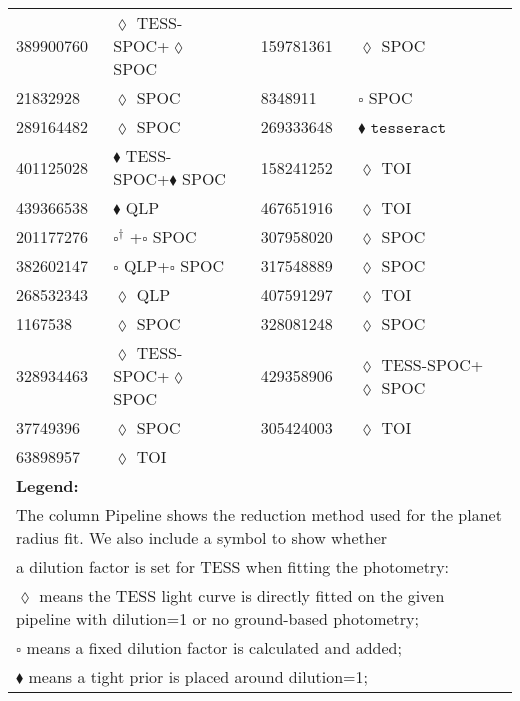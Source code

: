 \begin{longtable}{llrllr}
389900760 & $\lozenge$ TESS-SPOC+$\lozenge$ SPOC & \cite{TIC_343628284} & 159781361 & $\lozenge$ SPOC & \cite{TIC_232540264} \\
21832928 & $\lozenge$ SPOC & \cite{TIC_232540264} & 8348911 & $\square$ SPOC & \cite{TIC_8348911} \\
289164482 & $\lozenge$ SPOC & \cite{TIC_348755728} & 269333648 & $\blacklozenge$ $\texttt{tesseract}$ & \cite{TIC_4672985} \\
401125028 & $\blacklozenge$ TESS-SPOC+$\blacklozenge$ SPOC & \cite{TIC_446549906} & 158241252 & $\lozenge$ TOI & \cite{TIC_154872375} \\
439366538 & $\blacklozenge$ QLP & \cite{TIC_439366538} & 467651916 & $\lozenge$ TOI & \cite{TIC_154872375} \\
201177276 & $\square^\dagger$ +$\square$ SPOC  & \cite{TIC_201177276} & 307958020 & $\lozenge$ SPOC & \cite{TIC_307958020} \\
382602147 & $\square$ QLP+$\square$ SPOC & \cite{TIC_201177276} & 317548889 & $\lozenge$ SPOC & \cite{TIC_232540264} \\
268532343 & $\lozenge$ QLP & \cite{TIC_268532343} & 407591297 & $\lozenge$ TOI & \cite{TIC_154872375} \\
1167538 & $\lozenge$ SPOC & \cite{TIC_1167538} & 328081248 & $\lozenge$ SPOC & \cite{TIC_159418353} \\
328934463 & $\lozenge$ TESS-SPOC+$\lozenge$ SPOC& \cite{TIC_268532343} & 429358906 & $\lozenge$ TESS-SPOC+$\lozenge$ SPOC & \cite{TIC_343628284} \\
37749396 & $\lozenge$ SPOC & \cite{TIC_37749396} & 305424003 & $\lozenge$ TOI & \cite{TIC_154872375} \\
63898957 & $\lozenge$ TOI & \cite{TIC_154872375} \\
\hline
\multicolumn{6}{l}{\textbf{Legend:}} \\
\multicolumn{6}{l}{The column Pipeline shows the reduction method used for the planet radius fit. We also include a symbol to show whether } \\
\multicolumn{6}{l}{a dilution factor is set for TESS when fitting the photometry:} \\
\multicolumn{6}{l}{$\lozenge$ means the TESS light curve is directly fitted on the given pipeline with dilution=1 or no ground-based photometry;} \\
\multicolumn{6}{l}{$\square$ means a fixed dilution factor is calculated and added;} \\
\multicolumn{6}{l}{$\blacklozenge$ means a tight prior is placed around dilution=1;} \\

\end{longtable}
